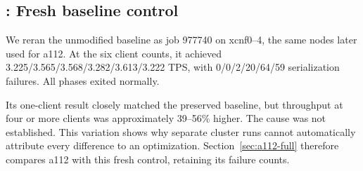 \subsection{: Fresh baseline control}
We reran the unmodified baseline as job 977740 on xcnf0--4, the same nodes later
used for a112. At the six client counts, it achieved
3.225/3.565/3.568/3.282/3.613/3.222 TPS, with
0/0/2/20/64/59 serialization failures. All phases exited normally.

Its one-client result closely matched the preserved baseline, but throughput
at four or more clients was approximately 39--56\% higher. The cause was not
established. This variation shows why separate cluster runs cannot automatically
attribute every difference to an optimization. Section~\ref{sec:a112-full}
therefore compares a112 with this fresh control, retaining its failure counts.
